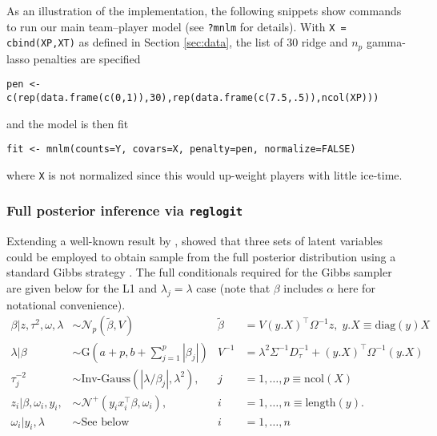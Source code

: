 As an illustration of the implementation, the following snippets show
commands to run our main team--player model (see \verb!?mnlm! for details).  With 
\verb!X = cbind(XP,XT)! as defined in Section \ref{sec:data}, the list
of 30 ridge and $n_p$ gamma-lasso penalties are specified 
\begin{verbatim}
pen <- c(rep(data.frame(c(0,1)),30),rep(data.frame(c(7.5,.5)),ncol(XP)))
\end{verbatim}
and the model is then fit
\begin{verbatim}
fit <- mnlm(counts=Y, covars=X, penalty=pen, normalize=FALSE)
\end{verbatim}
where \verb!X! is not normalized since this would up-weight players with little ice-time.


\subsubsection{Full posterior inference via {\tt reglogit}}

Extending a well-known result by \cite{holmes:held:2006},
\cite{gra:pols:2012} showed that three sets of latent variables could
be employed to obtain sample from the full posterior distribution
using a standard Gibbs strategy \cite{gem:gem:1984}.  The full
conditionals required for the Gibbs sampler are given below for the L1
and $\lambda_j = \lambda$ case (note that $\beta$ includes
$\alpha$ here for notational convenience).
\begin{align*}
  \beta | z, \tau^2, \omega, \lambda &\sim
  \mathcal{N}_p(\tilde{\beta}, V)
  & \tilde{\beta} & = V (y.X)^\top \Omega^{-1} z, \; y.X \equiv \mathrm{diag}(y)X \\
  \lambda |\beta &\sim \mathrm{G}\left( a + p, b + \sum_{j=1}^p |
    \beta_j |\right) & V^{-1} &= \lambda^{2} \Sigma^{-1} D_{\tau}^{-1}
  + (y.X)^\top
  \Omega^{-1} (y.X) \\
  \tau_j^{-2} &\sim \mbox{Inv-Gauss} (|\lambda/\beta_j|, \lambda^2),
  & j&=1,\dots, p \equiv \mathrm{ncol}(X) \\
  z_i | \beta, \omega_i, y_i, &\sim \mathcal{N}^+ \!\left( y_i
    x_i^\top
    \beta , \omega_i \right), & i&=1,\dots,n \equiv \mathrm{length}(y). \\
  \omega_i | y_i, \lambda &\sim \mbox{See below} &
  i&=1,\dots,n
\end{align*}

